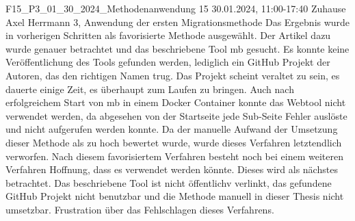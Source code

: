 \fieldnote
{F15\_P3\_01\_30\_2024\_Methodenanwendung}
{15}
{30.01.2024, 11:00-17:40}
{Zuhause}
{Axel Herrmann}
{3, Anwendung der ersten Migrationsmethode}
{
  Das Ergebnis  wurde in vorherigen Schritten als favorisierte Methode ausgewählt.
  Der Artikel dazu wurde genauer betrachtet und das beschriebene Tool \acrfull{mb} gesucht.
  Es konnte keine Veröffentlichung des Tools gefunden werden, lediglich ein GitHub Projekt der Autoren, das den richtigen Namen trug.
  Das Projekt scheint veraltet zu sein, es dauerte einige Zeit, es überhaupt zum Laufen zu bringen.
  Auch nach erfolgreichem Start von \gls{mb} in einem Docker Container konnte das Webtool nicht verwendet werden, da abgesehen von der Startseite jede Sub-Seite Fehler auslöste und nicht aufgerufen werden konnte.
  Da der manuelle Aufwand der Umsetzung dieser Methode als zu hoch bewertet wurde, wurde dieses Verfahren letztendlich verworfen.
}
{
  Nach diesem favorisiertem Verfahren besteht noch bei einem weiteren Verfahren Hoffnung, dass es verwendet werden könnte.
  Dieses wird als nächstes betrachtet.
}
{
}
{
  Das beschriebene Tool ist nicht öffentlichv verlinkt, das gefundene GitHub Projekt nicht benutzbar und die Methode manuell in dieser Thesis nicht umsetzbar.
}
{
  Frustration über das Fehlschlagen dieses Verfahrens.
}

